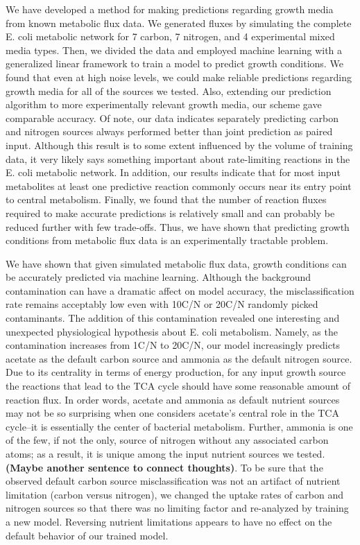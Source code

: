 \documentclass[12pt]{article}
\begin{document}
We have developed a method for making predictions regarding growth media from known metabolic flux data. We generated fluxes by simulating the complete E. coli metabolic network for 7 carbon, 7 nitrogen, and 4 experimental mixed media types. Then, we divided the data and employed machine learning with a generalized linear framework to train a model to predict growth conditions. We found that even at high noise levels, we could make reliable predictions regarding growth media for all of the sources we tested. Also, extending our prediction algorithm to more experimentally relevant growth media, our scheme gave comparable accuracy. Of note, our data indicates separately predicting carbon and nitrogen sources always performed better than joint prediction as paired input. Although this result is to some extent influenced by the volume of training data, it very likely says something important about rate-limiting reactions in the E. coli metabolic network. In addition, our results indicate that for most input metabolites at least one predictive reaction commonly occurs near its entry point to central metabolism. Finally, we found that the number of reaction fluxes required to make accurate predictions is relatively small and can probably be reduced further with few trade-offs. Thus, we have shown that predicting growth conditions from metabolic flux data is an experimentally tractable problem.

We have shown that given simulated metabolic flux data, growth conditions can be accurately predicted via machine learning. Although the background contamination can have a dramatic affect on model accuracy, the misclassification rate remains acceptably low even with 10C/N or 20C/N randomly picked contaminants. The addition of this contamination revealed one interesting and unexpected physiological hypothesis about E. coli metabolism. Namely, as the contamination increases from 1C/N to 20C/N, our model increasingly predicts acetate as the default carbon source and ammonia as the default nitrogen source.  Due to its centrality in terms of energy production, for any input growth source the reactions that lead to the TCA cycle should have some reasonable amount of reaction flux. In order words, acetate and ammonia as default nutrient sources may not be so surprising when one considers acetate's central role in the TCA cycle--it is essentially the center of bacterial metabolism. Further, ammonia is one of the few, if not the only, source of nitrogen without any associated carbon atoms; as a result, it is unique among the input nutrient sources we tested. \textbf{(Maybe another sentence to connect thoughts)}. To be sure that the observed default carbon source misclassification was not an artifact of nutrient limitation (carbon versus nitrogen), we changed the uptake rates of carbon and nitrogen sources so that there was no limiting factor and re-analyzed by training a new model. Reversing nutrient limitations appears to have no effect on the default behavior of our trained model.
\end{document}
